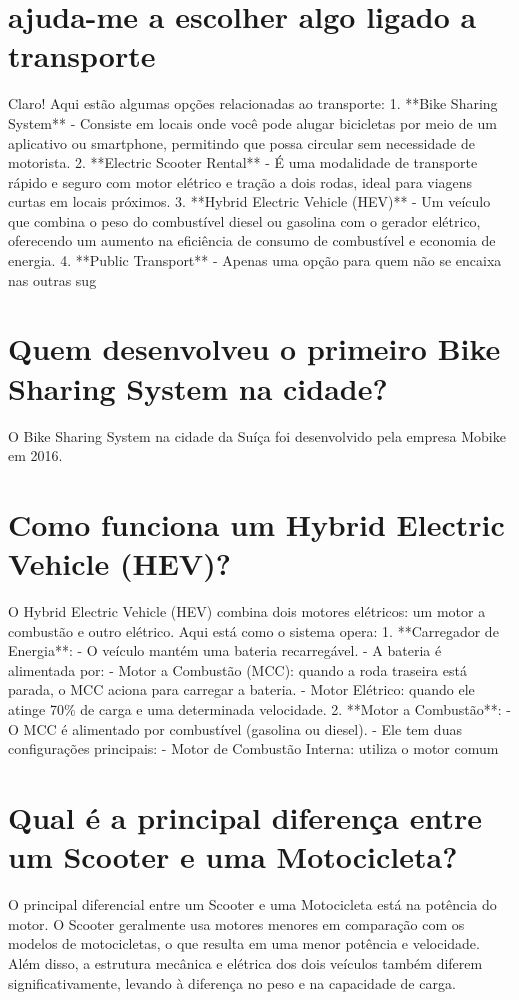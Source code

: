 \documentclass[11pt,a4paper]{article}
\begin{document}
\section{ajuda-me a escolher algo ligado a transporte}
Claro! Aqui estão algumas opções relacionadas ao transporte: 1. **Bike Sharing System** - Consiste em locais onde você pode alugar bicicletas por meio de um aplicativo ou smartphone, permitindo que possa circular sem necessidade de motorista. 2. **Electric Scooter Rental** - É uma modalidade de transporte rápido e seguro com motor elétrico e tração a dois rodas, ideal para viagens curtas em locais próximos. 3. **Hybrid Electric Vehicle (HEV)** - Um veículo que combina o peso do combustível diesel ou gasolina com o gerador elétrico, oferecendo um aumento na eficiência de consumo de combustível e economia de energia. 4. **Public Transport** - Apenas uma opção para quem não se encaixa nas outras sug

\section{Quem desenvolveu o primeiro Bike Sharing System na cidade?}
O Bike Sharing System na cidade da Suíça foi desenvolvido pela empresa Mobike em 2016.

\section{Como funciona um Hybrid Electric Vehicle (HEV)?}
O Hybrid Electric Vehicle (HEV) combina dois motores elétricos: um motor a combustão e outro elétrico. Aqui está como o sistema opera: 1. **Carregador de Energia**: - O veículo mantém uma bateria recarregável. - A bateria é alimentada por: - Motor a Combustão (MCC): quando a roda traseira está parada, o MCC aciona para carregar a bateria. - Motor Elétrico: quando ele atinge 70\% de carga e uma determinada velocidade. 2. **Motor a Combustão**: - O MCC é alimentado por combustível (gasolina ou diesel). - Ele tem duas configurações principais: - Motor de Combustão Interna: utiliza o motor comum

\section{Qual é a principal diferença entre um Scooter e uma Motocicleta?}
O principal diferencial entre um Scooter e uma Motocicleta está na potência do motor. O Scooter geralmente usa motores menores em comparação com os modelos de motocicletas, o que resulta em uma menor potência e velocidade. Além disso, a estrutura mecânica e elétrica dos dois veículos também diferem significativamente, levando à diferença no peso e na capacidade de carga.
\end{document}
